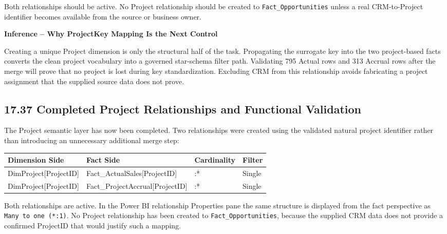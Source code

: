 \documentclass[11pt,a4paper]{article}
\begin{document}
Both relationships should be active. No Project relationship should be created
to \texttt{Fact\_Opportunities} unless a real CRM-to-Project identifier becomes
available from the source or business owner.

\begin{inferencebox}

\textbf{Inference -- Why ProjectKey Mapping Is the Next Control}

Creating a unique Project dimension is only the structural half of the task.
Propagating the surrogate key into the two project-based facts converts the
clean project vocabulary into a governed star-schema filter path. Validating
795 Actual rows and 313 Accrual rows after the merge will prove that no project
is lost during key standardization. Excluding CRM from this relationship avoids
fabricating a project assignment that the supplied source data does not prove.

\end{inferencebox}


\subsection{17.37 Completed Project Relationships and Functional Validation}

The Project semantic layer has now been completed. Two relationships were created
using the validated natural project identifier rather than introducing an
unnecessary additional merge step:

\begin{tabularx}{\textwidth}{
    >{\ttfamily\raggedright\arraybackslash}p{5.0cm}
    >{\ttfamily\raggedright\arraybackslash}p{5.0cm}
    >{\centering\arraybackslash}p{1.7cm}
    >{\centering\arraybackslash}X
}

\toprule

Dimension Side
&
Fact Side
&
Cardinality
&
Filter
\\

\midrule

DimProject[ProjectID]
&
Fact\_ActualSales[ProjectID]
&
1:*
&
Single
\\

DimProject[ProjectID]
&
Fact\_ProjectAccrual[ProjectID]
&
1:*
&
Single
\\

\bottomrule

\end{tabularx}

Both relationships are active. In the Power BI relationship Properties pane the
same structure is displayed from the fact perspective as
\texttt{Many to one (*:1)}. No Project relationship has been created to
\texttt{Fact\_Opportunities}, because the supplied CRM data does not provide a
confirmed ProjectID that would justify such a mapping.
\end{document}
